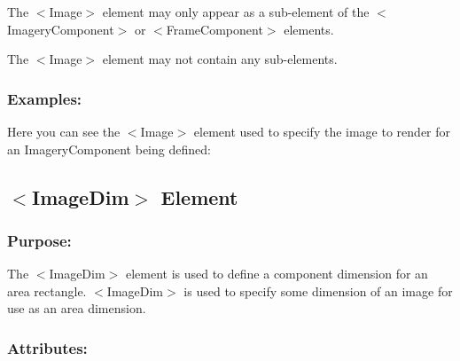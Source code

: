 \begin{DoxyItemize}
\item The {\ttfamily $<$Image$>$} element may only appear as a sub-\/element of the {\ttfamily $<$Imagery\+Component$>$} or {\ttfamily $<$Frame\+Component$>$} elements. 
\item The {\ttfamily $<$Image$>$} element may not contain any sub-\/elements. 
\end{DoxyItemize}\hypertarget{fal_element_ref_fal_elem_ref_sec_18_4}{}\subsubsection{Examples\+:}\label{fal_element_ref_fal_elem_ref_sec_18_4}
Here you can see the {\ttfamily $<$Image$>$} element used to specify the image to render for an Imagery\+Component being defined\+: 
\begin{DoxyCode}{0}
\end{DoxyCode}
\hypertarget{fal_element_ref_fal_elem_ref_sec_19}{}\subsection{$<$\+Image\+Dim$>$ Element}\label{fal_element_ref_fal_elem_ref_sec_19}
\hypertarget{fal_element_ref_fal_elem_ref_sec_19_1}{}\subsubsection{Purpose\+:}\label{fal_element_ref_fal_elem_ref_sec_19_1}
The {\ttfamily $<$Image\+Dim$>$} element is used to define a component dimension for an area rectangle. {\ttfamily $<$Image\+Dim$>$} is used to specify some dimension of an image for use as an area dimension.\hypertarget{fal_element_ref_fal_elem_ref_sec_19_2}{}\subsubsection{Attributes\+:}\label{fal_element_ref_fal_elem_ref_sec_19_2}
